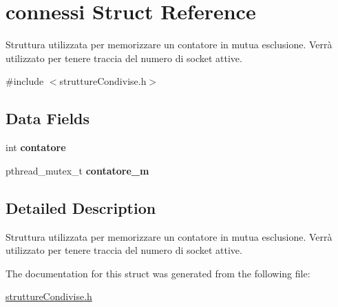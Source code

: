 \hypertarget{structconnessi}{}\section{connessi Struct Reference}
\label{structconnessi}


Struttura utilizzata per memorizzare un contatore in mutua esclusione. Verrà utilizzato per tenere traccia del numero di socket attive.  




{\ttfamily \#include $<$strutture\+Condivise.\+h$>$}

\subsection*{Data Fields}
\begin{DoxyCompactItemize}
\item 
\mbox{\label{structconnessi_a771224ca565e00115268ff336771a9b3}} 
int {\bfseries contatore}
\item 
\mbox{\label{structconnessi_a8aeae93377c4a008da7a10dda9d72429}} 
pthread\+\_\+mutex\+\_\+t {\bfseries contatore\+\_\+m}
\end{DoxyCompactItemize}


\subsection{Detailed Description}
Struttura utilizzata per memorizzare un contatore in mutua esclusione. Verrà utilizzato per tenere traccia del numero di socket attive. 

The documentation for this struct was generated from the following file\+:\begin{DoxyCompactItemize}
\item 
\hyperlink{strutture_condivise_8h}{strutture\+Condivise.\+h}\end{DoxyCompactItemize}
